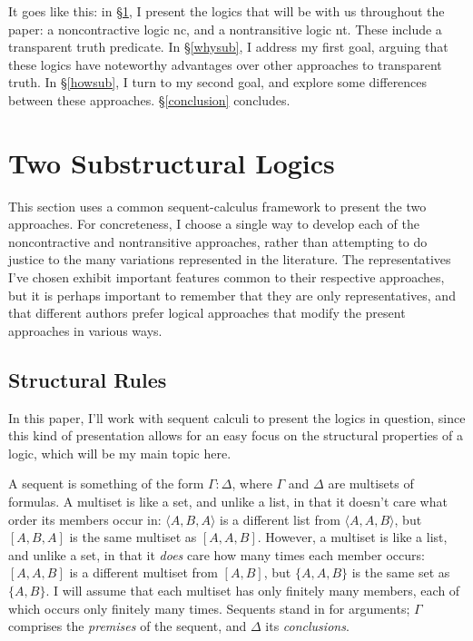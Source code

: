 \documentclass{ergoclass}
\newcommand{\sqq}[2]{\ensuremath{#1  \mathrel{:}  #2}}
\newcommand{\tuple}[1]{\ensuremath{\langle #1 \rangle}}
\newcommand{\nclog}{{\sc nc}}
\newcommand{\ntlog}{{\sc nt}}
\begin{document}
It goes like this: in \S\ref{2logics}, I present the logics that will be with us throughout the paper: a noncontractive logic \nclog, and a nontransitive logic \ntlog. These include a transparent truth predicate. In \S\ref{whysub}, I address my first goal, arguing that these logics have noteworthy advantages over other approaches to transparent truth. In \S\ref{howsub}, I turn to my second goal, and explore some differences between these approaches. \S\ref{conclusion} concludes.


\section{Two Substructural Logics} \label{2logics}

This section uses a common sequent-calculus framework to present the two approaches. For concreteness, I choose a single way to develop each of the noncontractive and nontransitive approaches, rather than attempting to do justice to the many variations represented in the literature. The representatives I've chosen exhibit important features common to their respective approaches, but it is perhaps important to remember that they are only representatives, and that different authors prefer logical approaches that modify the present approaches in various ways.

\subsection{Structural Rules} \label{structrules}

In this paper, I'll work with sequent calculi to present the logics in question, since this kind of presentation allows for an easy focus on the structural properties of a logic, which will be my main topic here.

A sequent is something of the form $\sqq{\Gamma}{\Delta}$, where $\Gamma$ and $\Delta$ are multisets of formulas. A multiset is like a set, and unlike a list, in that it doesn't care what order its members occur in: $\tuple{A, B, A}$ is a different list from $\tuple{A, A, B}$, but $[A, B, A]$ is the same multiset as $[A, A, B]$. However, a multiset is like a list, and unlike a set, in that it {\em does} care how many times each member occurs: $[A, A, B]$ is a different multiset from $[A, B]$, but $\{A, A, B\}$ is the same set as $\{A, B\}$. I will assume that each multiset has only finitely many members, each of which occurs only finitely many times. Sequents stand in for arguments; $\Gamma$ comprises the {\em premises} of the sequent, and $\Delta$ its {\em conclusions}.
\end{document}
